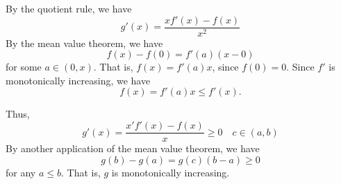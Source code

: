 \documentclass[12 pt, letterpaper]{hmcpset}
\begin{document}
\begin{solution}
	By the quotient rule, we have
	\[
		g'(x) = \frac{x f'(x) - f(x)}{x^{2}}
	\]
	By the mean value theorem, we have
	\[
		f(x) - f(0) = f'(a) (x - 0)
	\]
	for some $a \in (0, x)$. That is, $f(x) = f'(a) x$, since $f(0) = 0$. Since $f'$ is monotonically increasing, we have
	\[
		f(x) = f'(a) x \le f'(x).
	\]

	Thus,
	\[
		g'(x) = \frac{x'f'(x) - f(x)}{x} \ge 0 \quad c \in (a, b)
	\]
	By                 another application of the mean value theorem, we have
	\[
		g(b) - g(a) = g(c) (b - a) \ge 0
	\]
	for any $a \le b$. That is, $g$ is monotonically increasing.
\end{solution}
\end{document}

